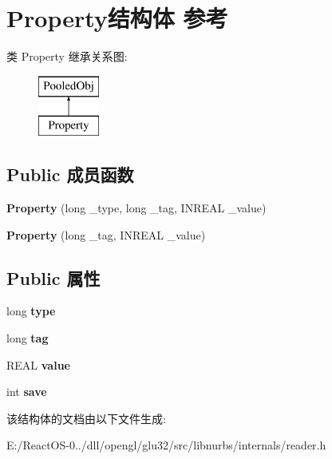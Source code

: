 \hypertarget{struct_property}{}\section{Property结构体 参考}
\label{struct_property}
类 Property 继承关系图\+:\begin{figure}[H]
\begin{center}
\leavevmode
\includegraphics[height=2.000000cm]{struct_property}
\end{center}
\end{figure}
\subsection*{Public 成员函数}
\begin{DoxyCompactItemize}
\item 
\mbox{\label{struct_property_aa6488bf11bcea9e07ca408e942143b41}} 
{\bfseries Property} (long \+\_\+type, long \+\_\+tag, I\+N\+R\+E\+AL \+\_\+value)
\item 
\mbox{\label{struct_property_a825399107b653258c8093c91530fecc0}} 
{\bfseries Property} (long \+\_\+tag, I\+N\+R\+E\+AL \+\_\+value)
\end{DoxyCompactItemize}
\subsection*{Public 属性}
\begin{DoxyCompactItemize}
\item 
\mbox{\label{struct_property_a077807b050dc06f40f9b1d2036c15ef2}} 
long {\bfseries type}
\item 
\mbox{\label{struct_property_a009a40bd557e0c35416116bbfef0751e}} 
long {\bfseries tag}
\item 
\mbox{\label{struct_property_a3ac1256d2db2ddad90cab961dc3272a3}} 
R\+E\+AL {\bfseries value}
\item 
\mbox{\label{struct_property_a85e2f4e7f889f28f1c8b4539e97fa2be}} 
int {\bfseries save}
\end{DoxyCompactItemize}


该结构体的文档由以下文件生成\+:\begin{DoxyCompactItemize}
\item 
E\+:/\+React\+O\+S-\/0../dll/opengl/glu32/src/libnurbs/internals/reader.\+h\end{DoxyCompactItemize}
